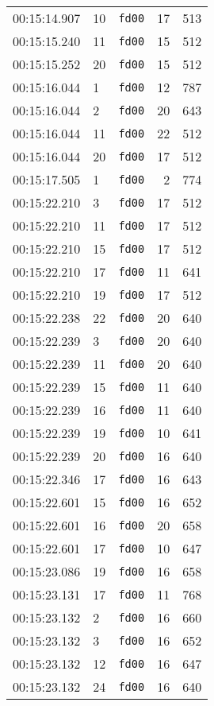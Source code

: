 \documentclass{article}
\begin{document}
\begin{longtable}{lllrr}
00:15:14.907 & 10 & \texttt{fd00} & 17 & 513 \\
00:15:15.240 & 11 & \texttt{fd00} & 15 & 512 \\
00:15:15.252 & 20 & \texttt{fd00} & 15 & 512 \\
00:15:16.044 & 1 & \texttt{fd00} & 12 & 787 \\
00:15:16.044 & 2 & \texttt{fd00} & 20 & 643 \\
00:15:16.044 & 11 & \texttt{fd00} & 22 & 512 \\
00:15:16.044 & 20 & \texttt{fd00} & 17 & 512 \\
00:15:17.505 & 1 & \texttt{fd00} & 2 & 774 \\
00:15:22.210 & 3 & \texttt{fd00} & 17 & 512 \\
00:15:22.210 & 11 & \texttt{fd00} & 17 & 512 \\
00:15:22.210 & 15 & \texttt{fd00} & 17 & 512 \\
00:15:22.210 & 17 & \texttt{fd00} & 11 & 641 \\
00:15:22.210 & 19 & \texttt{fd00} & 17 & 512 \\
00:15:22.238 & 22 & \texttt{fd00} & 20 & 640 \\
00:15:22.239 & 3 & \texttt{fd00} & 20 & 640 \\
00:15:22.239 & 11 & \texttt{fd00} & 20 & 640 \\
00:15:22.239 & 15 & \texttt{fd00} & 11 & 640 \\
00:15:22.239 & 16 & \texttt{fd00} & 11 & 640 \\
00:15:22.239 & 19 & \texttt{fd00} & 10 & 641 \\
00:15:22.239 & 20 & \texttt{fd00} & 16 & 640 \\
00:15:22.346 & 17 & \texttt{fd00} & 16 & 643 \\
00:15:22.601 & 15 & \texttt{fd00} & 16 & 652 \\
00:15:22.601 & 16 & \texttt{fd00} & 20 & 658 \\
00:15:22.601 & 17 & \texttt{fd00} & 10 & 647 \\
00:15:23.086 & 19 & \texttt{fd00} & 16 & 658 \\
00:15:23.131 & 17 & \texttt{fd00} & 11 & 768 \\
00:15:23.132 & 2 & \texttt{fd00} & 16 & 660 \\
00:15:23.132 & 3 & \texttt{fd00} & 16 & 652 \\
00:15:23.132 & 12 & \texttt{fd00} & 16 & 647 \\
00:15:23.132 & 24 & \texttt{fd00} & 16 & 640 \\

\end{longtable}
\end{document}
